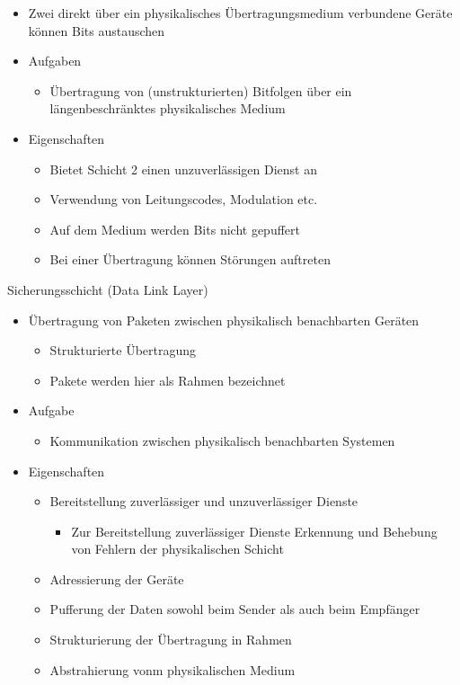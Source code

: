     \begin{itemize}
      \item Zwei direkt über ein physikalisches Übertragungsmedium verbundene Geräte können Bits
        austauschen
      \item Aufgaben
        \begin{itemize}
          \item Übertragung von (unstrukturierten) Bitfolgen über ein längenbeschränktes physikalisches
            Medium
        \end{itemize}
      \item Eigenschaften
        \begin{itemize}
          \item Bietet Schicht 2 einen unzuverlässigen Dienst an
          \item Verwendung von Leitungscodes, Modulation etc.
          \item Auf dem Medium werden Bits nicht gepuffert
          \item Bei einer Übertragung können Störungen auftreten
        \end{itemize}
    \end{itemize}
    Sicherungsschicht (Data Link Layer)
    \begin{itemize}
      \item Übertragung von Paketen zwischen physikalisch benachbarten Geräten
        \begin{itemize}
          \item Strukturierte Übertragung
          \item Pakete werden hier als Rahmen bezeichnet
        \end{itemize}
      \item Aufgabe
        \begin{itemize}
          \item Kommunikation zwischen physikalisch benachbarten Systemen
        \end{itemize}
      \item Eigenschaften
        \begin{itemize}
          \item Bereitstellung zuverlässiger und unzuverlässiger Dienste
            \begin{itemize}
              \item Zur Bereitstellung zuverlässiger Dienste Erkennung und Behebung von Fehlern der
                physikalischen Schicht
            \end{itemize}
          \item Adressierung der Geräte
          \item Pufferung der Daten sowohl beim Sender als auch beim Empfänger
          \item Strukturierung der Übertragung in Rahmen
          \item Abstrahierung vonm physikalischen Medium
        \end{itemize}
    \end{itemize}
